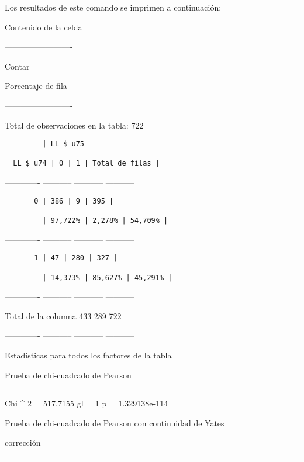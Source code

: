 \documentclass[
]{book}
\begin{document}
Los resultados de este comando se imprimen a continuación:

Contenido de la celda

------------------------- \textbar{}

Contar \textbar{}

Porcentaje de fila \textbar{}

------------------------- \textbar{}

Total de observaciones en la tabla: 722

\begin{verbatim}
         | LL $ u75

  LL $ u74 | 0 | 1 | Total de filas |
\end{verbatim}

------------- \textbar{} ----------- \textbar{} ----------- \textbar{} ----------- \textbar{}

\begin{verbatim}
       0 | 386 | 9 | 395 |

         | 97,722% | 2,278% | 54,709% |
\end{verbatim}

------------- \textbar{} ----------- \textbar{} ----------- \textbar{} ----------- \textbar{}

\begin{verbatim}
       1 | 47 | 280 | 327 |

         | 14,373% | 85,627% | 45,291% |
\end{verbatim}

------------- \textbar{} ----------- \textbar{} ----------- \textbar{} ----------- \textbar{}

Total de la columna \textbar{} 433 \textbar{} 289 \textbar{} 722 \textbar{}

------------- \textbar{} ----------- \textbar{} ----------- \textbar{} ----------- \textbar{}

Estadísticas para todos los factores de la tabla

Prueba de chi-cuadrado de Pearson

\begin{center}\rule{0.5\linewidth}{0.5pt}\end{center}

Chi \^{} 2 = 517.7155 gl = 1 p = 1.329138e-114

Prueba de chi-cuadrado de Pearson con continuidad de Yates

corrección

\begin{center}\rule{0.5\linewidth}{0.5pt}\end{center}
\end{document}
